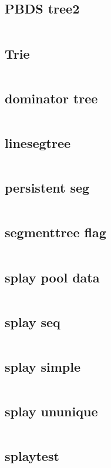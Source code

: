   \subsection{PBDS tree2}
    \inputminted{cpp}{../code/data_structure/PBDS_tree2.cpp}
  \subsection{Trie}
    \inputminted{cpp}{../code/data_structure/Trie.cpp}
  \subsection{dominator tree}
    \inputminted{cpp}{../code/data_structure/dominator_tree.cpp}
  \subsection{linesegtree}
    \inputminted{cpp}{../code/data_structure/linesegtree.cpp}
  \subsection{persistent seg}
    \inputminted{cpp}{../code/data_structure/persistent_seg.cpp}
  \subsection{segmenttree flag}
    \inputminted{cpp}{../code/data_structure/segmenttree_flag.cpp}
  \subsection{splay pool data}
    \inputminted{cpp}{../code/data_structure/splay_pool_data.cpp}
  \subsection{splay seq}
    \inputminted{cpp}{../code/data_structure/splay_seq.cpp}
  \subsection{splay simple}
    \inputminted{cpp}{../code/data_structure/splay_simple.cpp}
  \subsection{splay ununique}
    \inputminted{cpp}{../code/data_structure/splay_ununique.cpp}
  \subsection{splaytest}
    \inputminted{cpp}{../code/data_structure/splaytest.cpp}
